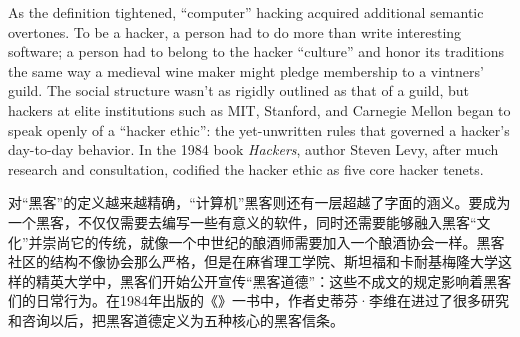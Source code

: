 \ifdefined\eng
As the definition tightened, ``computer'' hacking acquired additional semantic overtones. To be a hacker, a person had to do more than write interesting software; a person had to belong to the hacker ``culture'' and honor its traditions the same way a medieval wine maker might pledge membership to a vintners' guild. The social structure wasn't as rigidly outlined as that of a guild, but hackers at elite institutions such as MIT, Stanford, and Carnegie Mellon began to speak openly of a ``hacker ethic'': the yet-unwritten rules that governed a hacker's day-to-day behavior. In the 1984 book \textit{Hackers}, author Steven Levy, after much research and consultation, codified the hacker ethic as five core hacker tenets.
\fi

\ifdefined\chs
对“黑客”的定义越来越精确，“计算机”黑客则还有一层超越了字面的涵义。要成为一个黑客，不仅仅需要去编写一些有意义的软件，同时还需要能够融入黑客“文化”并崇尚它的传统，就像一个中世纪的酿酒师需要加入一个酿酒协会一样。黑客社区的结构不像协会那么严格，但是在麻省理工学院、斯坦福和卡耐基梅隆大学这样的精英大学中，黑客们开始公开宣传“黑客道德”：这些不成文的规定影响着黑客们的日常行为。在1984年出版的《》一书中，作者史蒂芬·李维在进过了很多研究和咨询以后，把黑客道德定义为五种核心的黑客信条。
\fi

